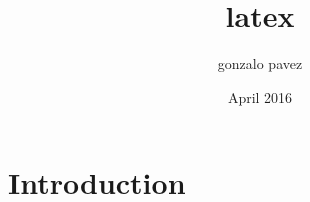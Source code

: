 \documentclass{article}
\title{latex}
\author{gonzalo pavez}
\date{April 2016}
\begin{document}
\maketitle

\section{Introduction}
\end{document}
